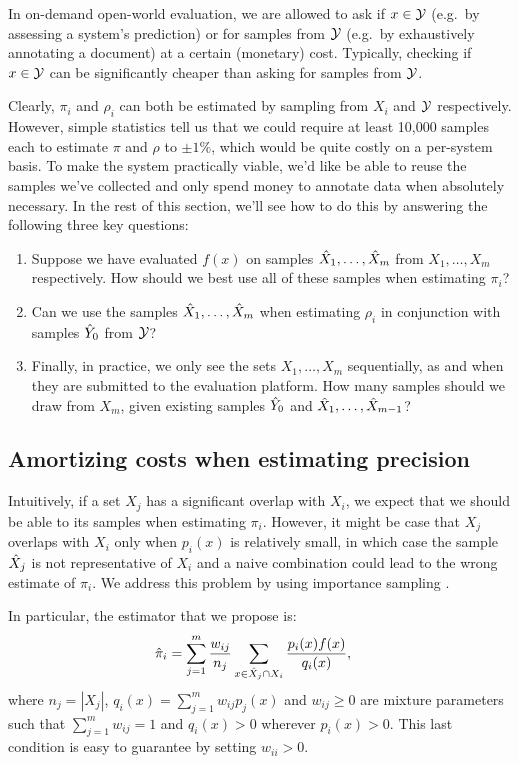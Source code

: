 In on-demand open-world evaluation, we are allowed to ask if $x \in \mathcal{Y}$ (e.g.\ by assessing a system's prediction) or for samples from $\mathcal{Y}$ (e.g.\ by exhaustively annotating a document) at a certain (monetary) cost.
Typically, checking if $x \in \mathcal{Y}$ can be significantly cheaper than asking for samples from $\mathcal{Y}$.

Clearly, $\pi_i$ and $\rho_i$ can both be estimated by sampling from $X_i$ and $\mathcal{Y}$ respectively.
However, simple statistics tell us that we could require at least 10,000 samples each to estimate $\pi$ and $\rho$ to $\pm 1\%$, which would be quite costly on a per-system basis.
To make the system practically viable, we'd like be able to reuse the samples we've collected and only spend money to annotate data when absolutely necessary.
In the rest of this section, we'll see how to do this by answering the following three key questions:
\begin{enumerate}
  \item Suppose we have evaluated $f(x)$ on samples ${\hat{X}}_1, \ldots, {\hat{X}}_m$ from $X_1, \ldots, X_m$ respectively. How should we best use all of these samples when estimating $\pi_i$?
  \item 
    Can we use the samples ${\hat{X}}_1, \ldots, {\hat{X}}_m$ when estimating $\rho_i$ in conjunction with samples ${\hat{Y}}_0$ from $\mathcal{Y}$?
  \item Finally, in practice, we only see the sets $X_1, \ldots, X_m$ sequentially, as and when they are submitted to the evaluation platform. How many samples should we draw from $X_m$, given existing samples ${\hat{Y}}_0$ and ${\hat{X}}_1, \ldots, {\hat{X}}_{m-1}$?
\end{enumerate}

\subsection{Amortizing costs when estimating precision}

Intuitively, if a set $X_j$ has a significant overlap with $X_i$, we expect that we should be able to its samples when estimating $\pi_i$.
However, it might be case that $X_j$ overlaps with $X_i$ only when $p_i(x)$ is relatively small, in which case the sample ${\hat{X}}_j$ is not representative of $X_i$ and a naive combination could lead to the wrong estimate of $\pi_i$.
We address this problem by using importance sampling \citep{owen2013monte}.

In particular, the estimator that we propose is:
\begin{align*}
  {\hat{\pi}}_i &= \sum_{j=1}^m \frac{w_{ij}}{n_{j}} \sum_{x \in {\hat{X}}_j \cap X_i} \frac{p_i(x) f(x)}{q_i(x)},
\end{align*}
where $n_{j} = |X_j|$, $q_i(x) = \sum_{j=1}^m w_{ij} p_j(x)$ and $w_{ij} \ge 0$ are mixture parameters such that $\sum_{j=1}^m w_{ij} = 1$ and $q_i(x) > 0$ wherever $p_i(x) > 0$.
This last condition is easy to guarantee by setting $w_{ii} > 0$.

